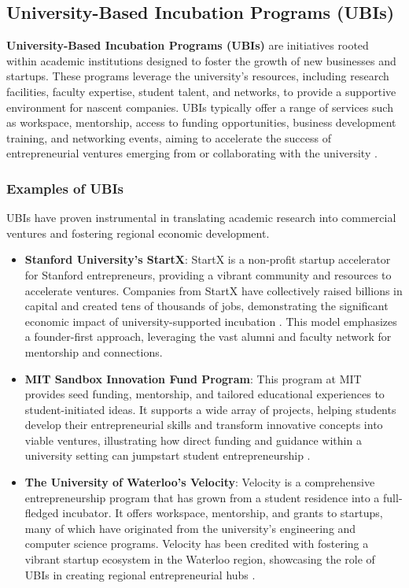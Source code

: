 \documentclass[../Main.tex]{subfiles}
\begin{document}
\subsection{University-Based Incubation Programs (UBIs)}
\textbf{University-Based Incubation Programs (UBIs)} are initiatives rooted within academic institutions designed to foster the growth of new businesses and startups. These programs leverage the university's resources, including research facilities, faculty expertise, student talent, and networks, to provide a supportive environment for nascent companies. UBIs typically offer a range of services such as workspace, mentorship, access to funding opportunities, business development training, and networking events, aiming to accelerate the success of entrepreneurial ventures emerging from or collaborating with the university \cite{grimaldi2005university, siegel2003assessing}.

\subsubsection*{Examples of UBIs}
UBIs have proven instrumental in translating academic research into commercial ventures and fostering regional economic development.
\begin{itemize}
    \item \textbf{Stanford University's StartX}: StartX is a non-profit startup accelerator for Stanford entrepreneurs, providing a vibrant community and resources to accelerate ventures. Companies from StartX have collectively raised billions in capital and created tens of thousands of jobs, demonstrating the significant economic impact of university-supported incubation \cite{StartX2024}. This model emphasizes a founder-first approach, leveraging the vast alumni and faculty network for mentorship and connections.
    \item \textbf{MIT Sandbox Innovation Fund Program}: This program at MIT provides seed funding, mentorship, and tailored educational experiences to student-initiated ideas. It supports a wide array of projects, helping students develop their entrepreneurial skills and transform innovative concepts into viable ventures, illustrating how direct funding and guidance within a university setting can jumpstart student entrepreneurship \cite{MITSandbox2024}.
    \item \textbf{The University of Waterloo's Velocity}: Velocity is a comprehensive entrepreneurship program that has grown from a student residence into a full-fledged incubator. It offers workspace, mentorship, and grants to startups, many of which have originated from the university's engineering and computer science programs. Velocity has been credited with fostering a vibrant startup ecosystem in the Waterloo region, showcasing the role of UBIs in creating regional entrepreneurial hubs \cite{UWaterlooVelocity2024}.
\end{itemize}
\end{document}
